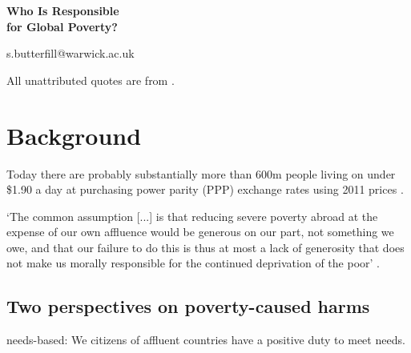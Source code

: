 \documentclass[12pt]{extarticle}
\date{}
\makeatletter
\def \ititle {Central Themes in Philospohy}
\def \isubtitle {Lecture 07}
\def \iemail{s.butterfill@warwick.ac.uk}
\makeatother
\begin{document}
\begin{multicols*}{3}

\setlength\footnotesep{1em}









      
\def \ititle {Who Is Responsible \\ for Global Poverty?}
 
\def \isubtitle {}
 
\begin{center}
 
{\Large
 
\textbf{\ititle}
 
}
 
 
 
\iemail %
 
\end{center}
 
All unattributed quotes are from \citet{pogge:2005_world}.

\section{Background}
 
Today there are probably substantially more than 600m people living on under \$1.90 a day
at purchasing power parity (PPP) exchange rates using 2011 prices \citep{webber:2020_we}.

 
‘The common assumption [...] is that reducing severe poverty  abroad 
at the expense of our own affluence 
 would be generous on our part, 
not something we owe, and that our failure to do this is thus at most 
a lack of  generosity that does not make us morally responsible 
 for the continued  deprivation of the poor’ 
\citep[p.~2]{pogge:2005_world}.


\subsection{Two perspectives on poverty-caused harms}

needs-based: We citizens of affluent countries
have a positive duty to meet needs.


\end{multicols*}
\end{document}

